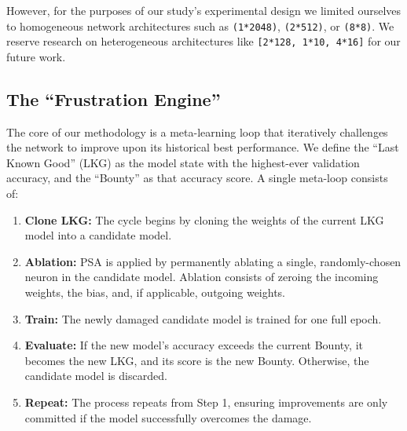 \documentclass[conference]{IEEEtran}
\begin{document}
However, for the purposes of our study's experimental design we limited ourselves to homogeneous network architectures such as \verb|(1*2048)|, \verb|(2*512)|, or \verb|(8*8)|. We reserve research on heterogeneous architectures like \verb|[2*128, 1*10, 4*16]| for our future work.

\subsection{The ``Frustration Engine''}
The core of our methodology is a meta-learning loop that iteratively challenges the network to improve upon its historical best performance. We define the ``Last Known Good'' (LKG) as the model state with the highest-ever validation accuracy, and the ``Bounty'' as that accuracy score. A single meta-loop consists of:
\begin{enumerate}
    \item \textbf{Clone LKG:} The cycle begins by cloning the weights of the current LKG model into a candidate model.
    \item \textbf{Ablation:} PSA is applied by permanently ablating a single, randomly-chosen neuron in the candidate model. Ablation consists of zeroing the incoming weights, the bias, and, if applicable, outgoing weights.
    \item \textbf{Train:} The newly damaged candidate model is trained for one full epoch.
    \item \textbf{Evaluate:} If the new model's accuracy exceeds the current Bounty, it becomes the new LKG, and its score is the new Bounty. Otherwise, the candidate model is discarded.
    \item \textbf{Repeat:} The process repeats from Step 1, ensuring improvements are only committed if the model successfully overcomes the damage.
\end{enumerate}
\end{document}
